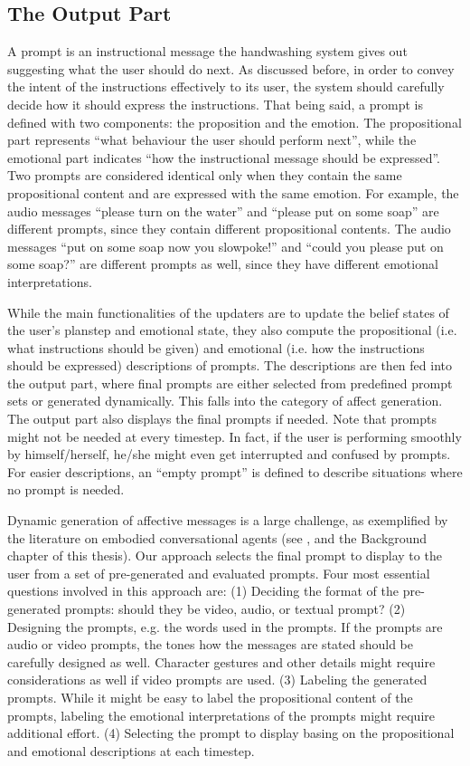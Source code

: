 \subsection{The Output Part}

A prompt is an instructional message the handwashing system gives out suggesting what the user should do next. As discussed before, in order to convey the intent of the instructions effectively to its user, the system should carefully decide how it should express the instructions. That being said, a prompt is defined with two components: the proposition and the emotion. The propositional part represents ``what behaviour the user should perform next'', while the emotional part indicates ``how the instructional message should be expressed''. Two prompts are considered identical only when they contain the same propositional content and are expressed with the same emotion. For example, the audio messages ``please turn on the water'' and ``please put on some soap'' are different prompts, since they contain different propositional contents. The audio messages ``put on some soap now you slowpoke!'' and ``could you please put on some soap?'' are different prompts as well, since they have different emotional interpretations.

While the main functionalities of the updaters are to update the belief states of the user's planstep and emotional state, they also compute the propositional (i.e. what instructions should be given) and emotional (i.e. how the instructions should be expressed) descriptions of prompts. The descriptions are then fed into the output part, where final prompts are either selected from predefined prompt sets or generated dynamically. This falls into the category of affect generation. The output part also displays the final prompts if needed. Note that prompts might not be needed at every timestep. In fact, if the user is performing smoothly by himself/herself, he/she might even get interrupted and confused by prompts. For easier descriptions, an ``empty prompt'' is defined to describe situations where no prompt is needed.

Dynamic generation of affective messages is a large challenge, as exemplified by the literature on embodied conversational agents (see \cite{cassell2000embodied, niewiadomski2013computational}, and the Background chapter of this thesis). Our approach selects the final prompt to display to the user from a set of pre-generated and evaluated prompts. Four most essential questions involved in this approach are: (1) Deciding the format of the pre-generated prompts: should they be video, audio, or textual prompt? (2) Designing the prompts, e.g. the words used in the prompts. If the prompts are audio or video prompts, the tones how the messages are stated should be carefully designed as well. Character gestures and other details might require considerations as well if video prompts are used. (3) Labeling the generated prompts. While it might be easy to label the propositional content of the prompts, labeling the emotional interpretations of the prompts might require additional effort. (4) Selecting the prompt to display basing on the propositional and emotional descriptions at each timestep. 

